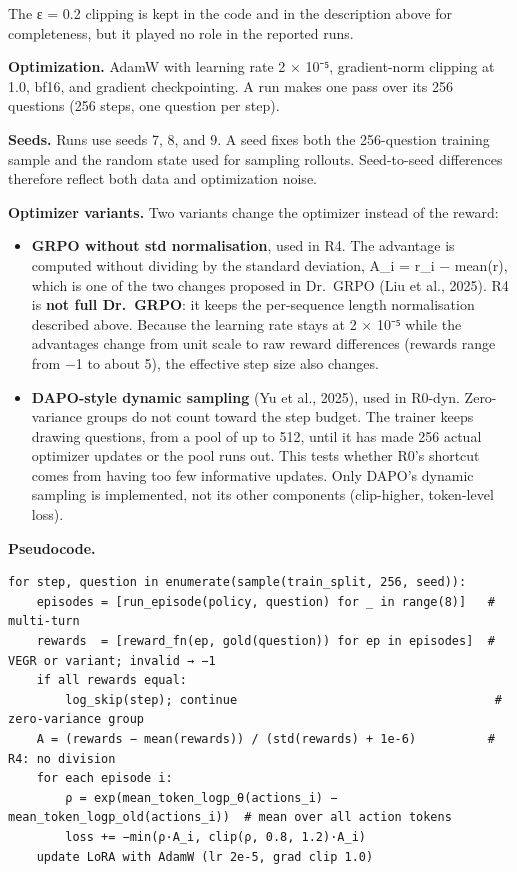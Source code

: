 The ε = 0.2 clipping is kept in the code and in the description above
for completeness, but it played no role in the reported runs.

\textbf{Optimization.} AdamW with learning rate 2 × 10⁻⁵, gradient-norm
clipping at 1.0, bf16, and gradient checkpointing. A run makes one pass
over its 256 questions (256 steps, one question per step).

\textbf{Seeds.} Runs use seeds 7, 8, and 9. A seed fixes both the
256-question training sample and the random state used for sampling
rollouts. Seed-to-seed differences therefore reflect both data and
optimization noise.

\textbf{Optimizer variants.} Two variants change the optimizer instead
of the reward:

\begin{itemize}
\tightlist
\item
  \textbf{GRPO without std normalisation}, used in R4. The advantage is
  computed without dividing by the standard deviation, A\_i = r\_i −
  mean(r), which is one of the two changes proposed in Dr.~GRPO (Liu et
  al., 2025). R4 is \textbf{not full Dr.~GRPO}: it keeps the
  per-sequence length normalisation described above. Because the
  learning rate stays at 2 × 10⁻⁵ while the advantages change from unit
  scale to raw reward differences (rewards range from −1 to about 5),
  the effective step size also changes.
\item
  \textbf{DAPO-style dynamic sampling} (Yu et al., 2025), used in
  R0-dyn. Zero-variance groups do not count toward the step budget. The
  trainer keeps drawing questions, from a pool of up to 512, until it
  has made 256 actual optimizer updates or the pool runs out. This tests
  whether R0's shortcut comes from having too few informative updates.
  Only DAPO's dynamic sampling is implemented, not its other components
  (clip-higher, token-level loss).
\end{itemize}

\textbf{Pseudocode.}

\begin{Verbatim}
for step, question in enumerate(sample(train_split, 256, seed)):
    episodes = [run_episode(policy, question) for _ in range(8)]   # multi-turn
    rewards  = [reward_fn(ep, gold(question)) for ep in episodes]  # VEGR or variant; invalid → −1
    if all rewards equal:
        log_skip(step); continue                                    # zero-variance group
    A = (rewards − mean(rewards)) / (std(rewards) + 1e-6)          # R4: no division
    for each episode i:
        ρ = exp(mean_token_logp_θ(actions_i) − mean_token_logp_old(actions_i))  # mean over all action tokens
        loss += −min(ρ·A_i, clip(ρ, 0.8, 1.2)·A_i)
    update LoRA with AdamW (lr 2e-5, grad clip 1.0)
\end{Verbatim}

